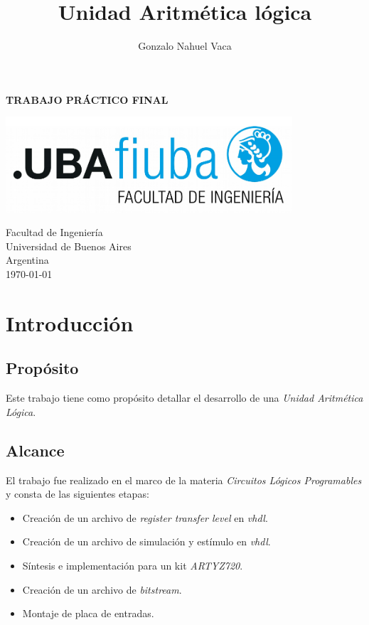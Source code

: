 \documentclass[
    11pt,
    spanish,
	a4paper
]{article}
\title{Unidad Aritmética lógica}
\author{Gonzalo Nahuel Vaca}
\def\doctype{TRABAJO PRÁCTICO FINAL}
\begin{document}
\makeatletter
\begin{titlepage}
	\begin{center}
		\vspace*{1cm}
		
		\Huge
		\textbf{\doctype}
		
		\vspace{0.5cm}
		\LARGE
		\@title
		
		\vspace{1.5cm}
		
		\textbf{\@author}

		\vspace{3.5cm}

		\includegraphics[width=0.8\textwidth]{img/logoFIUBA.pdf}
		
		\vfill
		Facultad de Ingeniería\\
		Universidad de Buenos Aires\\
		Argentina\\
		\today
	\end{center}
\end{titlepage}
\makeatother
\newpage

\section{Introducción}
\label{sec:introduccion}

\subsection{Propósito}
\label{subsec:proposito}

Este trabajo tiene como propósito detallar el desarrollo de una \emph{Unidad Aritmética Lógica}.

\subsection{Alcance}
\label{subsec:alcance}

El trabajo fue realizado en el marco de la materia \emph{Circuitos Lógicos Programables} y consta de las siguientes etapas:

\begin{itemize}
    \item Creación de un archivo de \emph{register transfer level} en \emph{vhdl}.
    \item Creación de un archivo de simulación y estímulo en \emph{vhdl}.
    \item Síntesis e implementación para un kit \emph{ARTYZ720}.
    \item Creación de un archivo de \emph{bitstream}.
    \item Montaje de placa de entradas.
\end{itemize}
\end{document}

